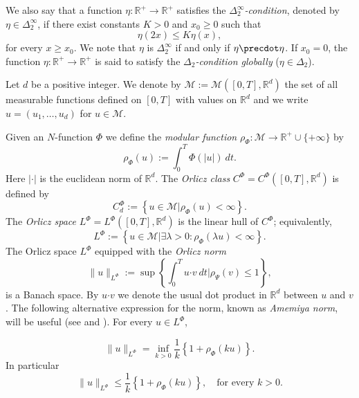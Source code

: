 \documentclass[twoside]{article}
\theoremstyle{remark}
\newcommand{\orlnor}{\|_{L^{\Phi}}}
\newcommand{\lphi}{L^{\Phi}}
\newcommand{\claseor}{C^{\Phi}}
\renewcommand{\b}[1]{\boldsymbol{#1}}
\newcommand{\rr}{\mathbb{R}}
\renewcommand{\leq}{\leqslant}
\renewcommand{\geq}{\geqslant}
\begin{document}
We also say that a function $\eta:\mathbb{R}^+\rightarrow \mathbb{R}^+$ satisfies the  \emph{$\Delta_2^{\infty}$-condition}, denoted by $\eta \in \Delta_2^{\infty}$,
if there exist  constants $K>0$ and  $x_0\geq 0$ such that
\begin{equation}\label{delta2defi}\eta(2x)\leq K\eta(x),
\end{equation}
for every $x\geq x_0$. We note that $\eta$ is $\Delta_2^{\infty}$ if and only if $\eta\precdot\eta$.
If $x_0=0$,  the function   $\eta:\mathbb{R}^+\rightarrow \mathbb{R}^+$ is said to satisfy the \emph{$\Delta_2$-condition globally} ($\eta \in \Delta_2$).



Let $d$ be a positive integer. We denote by $\mathcal{M}:=\mathcal{M}([0,T],\rr^d)$ the set of all measurable functions defined on $[0,T]$ with values on $\mathbb{R}^d$ and  we write $u=(u_1,\dots,u_d)$ for  $u\in \mathcal{M}$.



Given  an $N$-function $\Phi$ we define the \emph{modular function} 
$\rho_{\Phi}:\mathcal{M}\to \mathbb{R}^+\cup\{+\infty\}$ by
\[\rho_{\Phi}(u):= \int_0^T \Phi(|u|)\ dt.\]
Here $|\cdot|$ is the euclidean norm of $\mathbb{R}^d$.
The \emph{Orlicz class} $C^{\Phi}=C^{\Phi}([0,T],\rr^d)$  is defined  by
\begin{equation}\label{claseOrlicz}
  C^{\Phi}_d:=\left\{u\in \mathcal{M} | \rho_{\Phi}(u)< \infty \right\}.
\end{equation}
The \emph{Orlicz space} $\lphi=L^{\Phi}([0,T],\rr^d)$ is the linear hull of $\claseor$;
equivalently,
\begin{equation}\label{espacioOrlicz}
\lphi:=\left\{ u\in \mathcal{M}| \exists \lambda>0: \rho_{\Phi}(\lambda u) < \infty   \right\}.
\end{equation}
  The Orlicz space $\lphi$ equipped with the \emph{Orlicz norm}
\[
\|  u  \orlnor:=\sup \left\{  \int_0^T u\b{\cdot} v\ dt \big| \rho_{\Psi}(v)\leq 1\right\},
\]
is a Banach space. By $u\b{\cdot} v$ we denote the usual dot product in $\mathbb{R}^{d}$ between $u$ and $v$.
The following alternative expression for the norm, known as \emph{Amemiya norm},     will  be useful (see \cite[Thm. 10.5]{KR} and \cite{hudzik2000amemiya}). For every $u\in\lphi$,

\begin{equation}\label{amemiya}
\|u\orlnor=\inf\limits_{k>0}\frac{1}{k}\left\{1+\rho_{\Phi}(ku)\right\}.
\end{equation}
In particular
\begin{equation}\label{amemiya-ine}
\|u\orlnor\leq \frac{1}{k}\left\{1+\rho_{\Phi}(ku)\right\},\quad\text{for every } k>0.
\end{equation}
\end{document}
